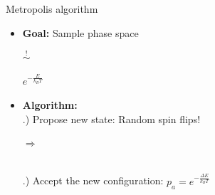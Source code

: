 \documentclass{beamer}
\begin{document}
\begin{frame}{Metropolis algorithm}
\begin{itemize}
    \item \textbf{Goal:} Sample phase space\\
        \vspace{3mm}
        \begin{minipage}[c]{0.4\textwidth}
            
        \end{minipage}
        \begin{minipage}[c]{0.2\textwidth} {\Huge $\stackrel{!}{\sim}$} \end{minipage}
        \begin{minipage}[c]{0.3\textwidth} {\Huge $e^{-\frac{E}{k_B T}}$} \end{minipage} \pause
    \item \textbf{Algorithm:}\\ .) Propose new state: Random spin flips!\\
            \vspace{2mm}
            \begin{minipage}{0.3\textwidth}
                
            \end{minipage}
            \hfill
            \begin{minipage}[c]{0.2\textwidth} {\Huge $\Rightarrow$} \end{minipage}
            \begin{minipage}[c]{0.3\textwidth}
                
            \end{minipage}\\ .) Accept the new configuration: $p_a = e^{-\frac{\Delta E}{k_B T}}$
\end{itemize}
\end{frame}
\end{document}
